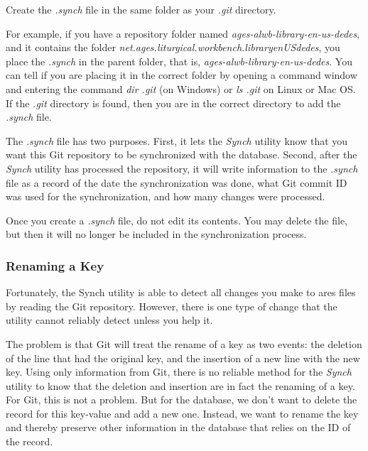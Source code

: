 \documentclass[]{memoir}
\begin{document}
Create the \emph{.synch} file in the same folder as your \emph{.git} directory.  

For example, if you have a repository folder named \emph{ages-alwb-library-en-us-dedes}, and it contains the folder \emph{net.ages.liturgical.workbench.library\textunderscore  en\textunderscore US\textunderscore dedes}, you place the \emph{.synch} in the parent folder, that is, \emph{ages-alwb-library-en-us-dedes}.  You can tell if you are placing it in the correct folder by opening a command window and entering the command \emph{dir .git} (on Windows) or \emph{ls .git} on Linux or Mac OS.  If the \emph{.git} directory is found, then you are in the correct directory to add the \emph{.synch} file.

The \emph{.synch} file has two purposes.  First, it lets the \emph{Synch} utility know that you want this Git repository to be synchronized with the database.  Second, after the \emph{Synch} utility has processed the repository, it will write information to the \emph{.synch} file as a record of the date the synchronization was done, what Git commit ID was used for the synchronization, and how many changes were processed.

\begin{warning}
Once you create a \emph{.synch} file, do not edit its contents. You may delete the file, but then it will no longer be included in the synchronization process.  
\end{warning}

\subsubsection{Renaming a Key}

Fortunately, the Synch utility is able to detect all changes you make to ares files by reading the Git repository.  However, there is one type of change that the utility cannot reliably detect unless you help it.  

The problem is that Git will treat the rename of a key as two events: the deletion of the line that had the original key, and the insertion of a new line with the new key.  Using only information from Git, there is no reliable method for the \emph{Synch} utility to know that the deletion and insertion are in fact the renaming of a key.  For Git, this is not a problem.  But for the database, we don't want to delete the record for this key-value and add a new one.  Instead, we want to rename the key and thereby preserve other information in the database that relies on the ID of the record.
\end{document}
